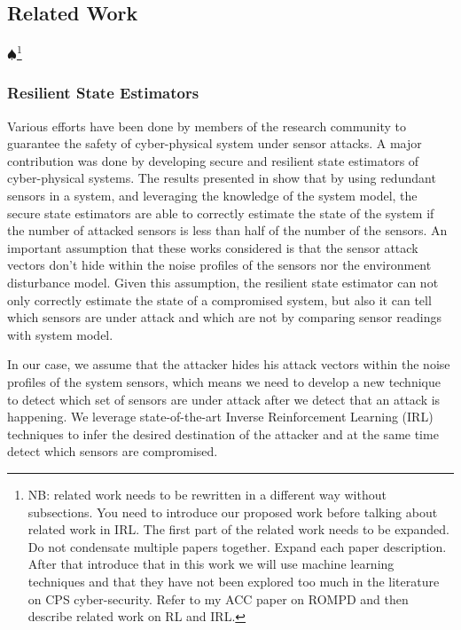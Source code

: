 \documentclass[conference]{IEEEtran}
\newcommand\NB[1]{$\spadesuit$\footnote{NB: #1}}
\begin{document}
\subsection{Related Work}\label{subsec:related}
\NB{related work needs to be rewritten in a different way without subsections. You need to introduce our proposed work before talking about related work in IRL. The first part of the related work needs to be expanded. Do not condensate multiple papers together. Expand each paper description. After that introduce that in this work we will use machine learning techniques and that they have not been explored too much in the literature on CPS cyber-security. Refer to my ACC paper on ROMPD and then describe related work on RL and IRL.}

\subsubsection{Resilient State Estimators}

Various efforts have been done by members of the research community to guarantee the safety of cyber-physical system under sensor attacks. A major contribution was done by developing secure and resilient state estimators of cyber-physical systems. The results presented in \cite{Fawzi2014,Ivanov2014,Pajic2014,Pajic2017} show that by using redundant sensors in a system, and leveraging the knowledge of the system model, the secure state estimators are able to correctly estimate the state of the system if the number of attacked sensors is less than half of the number of the sensors. An important assumption that these works considered is that the sensor attack vectors don't hide within the noise profiles of the sensors nor the environment disturbance model. Given this assumption, the resilient state estimator can not only correctly estimate the state of a compromised system, but also it can tell which sensors are under attack and which are not by comparing sensor readings with system model.

In our case, we assume that the attacker hides his attack vectors within the noise profiles of the system sensors, which means we need to develop a new technique to detect which set of sensors are under attack after we detect that an attack is happening. We leverage state-of-the-art Inverse Reinforcement Learning (IRL) techniques to infer the desired destination of the attacker and at the same time detect which sensors are compromised.
\end{document}
